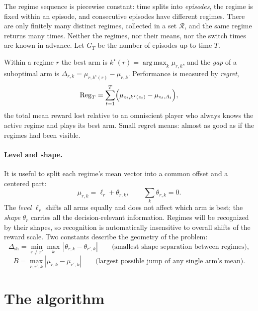 \documentclass[11pt]{article}
\newcommand{\Rcal}{\mathcal R}
\newcommand{\Reg}{\mathrm{Reg}}
\newcommand{\argmax}{\operatorname*{arg\,max}}
\newcommand{\dsh}{\Delta_{\mathrm{sh}}}
\begin{document}
The regime sequence is piecewise constant: time splits into \emph{episodes}, the regime is fixed within an episode, and consecutive episodes have different regimes. There are only finitely many distinct regimes, collected in a set $\Rcal$, and the same regime returns many times. Neither the regimes, nor their means, nor the switch times are known in advance. Let $G_T$ be the number of episodes up to time $T$.

Within a regime $r$ the best arm is $k^\star(r)=\argmax_k\mu_{r,k}$, and the \emph{gap} of a suboptimal arm is $\Delta_{r,k}=\mu_{r,k^\star(r)}-\mu_{r,k}$. Performance is measured by \emph{regret},
\begin{equation}
    \Reg_T=\sum_{t=1}^T\Bigl(\mu_{z_t,k^\star(z_t)}-\mu_{z_t,A_t}\Bigr),
\end{equation}
the total mean reward lost relative to an omniscient player who always knows the active regime and plays its best arm. Small regret means: almost as good as if the regimes had been visible.

\paragraph{Level and shape.}
It is useful to split each regime's mean vector into a common offset and a centered part:
\begin{equation}
    \mu_{r,k}=\ell_r+\theta_{r,k},\qquad \textstyle\sum_k\theta_{r,k}=0 .
\end{equation}
The \emph{level} $\ell_r$ shifts all arms equally and does not affect which arm is best; the \emph{shape} $\theta_r$ carries all the decision-relevant information. Regimes will be recognized by their shapes, so recognition is automatically insensitive to overall shifts of the reward scale. Two constants describe the geometry of the problem:
\begin{equation}
    \dsh=\min_{r\ne r'}\max_k\,|\theta_{r,k}-\theta_{r',k}|
    \qquad\text{(smallest shape separation between regimes)},
\end{equation}
\begin{equation}
    B=\max_{r,r',k}|\mu_{r,k}-\mu_{r',k}|
    \qquad\text{(largest possible jump of any single arm's mean)} .
\end{equation}

\section{The algorithm}
\end{document}
